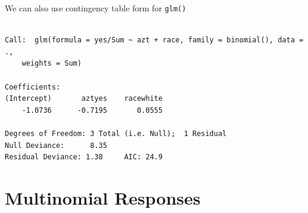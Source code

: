 \documentclass[]{book}
\newenvironment{Shaded}{\begin{snugshade}}{\end{snugshade}}
\newcommand{\DataTypeTok}[1]{\textcolor[rgb]{0.13,0.29,0.53}{#1}}
\newcommand{\KeywordTok}[1]{\textcolor[rgb]{0.13,0.29,0.53}{\textbf{#1}}}
\newcommand{\NormalTok}[1]{#1}
\newcommand{\OperatorTok}[1]{\textcolor[rgb]{0.81,0.36,0.00}{\textbf{#1}}}
\newcommand{\StringTok}[1]{\textcolor[rgb]{0.31,0.60,0.02}{#1}}
\begin{document}
We can also use contingency table form for \texttt{glm()}

\begin{Shaded}
\end{Shaded}

\begin{verbatim}

Call:  glm(formula = yes/Sum ~ azt + race, family = binomial(), data = ., 
    weights = Sum)

Coefficients:
(Intercept)       aztyes    racewhite  
    -1.0736      -0.7195       0.0555  

Degrees of Freedom: 3 Total (i.e. Null);  1 Residual
Null Deviance:      8.35 
Residual Deviance: 1.38     AIC: 24.9
\end{verbatim}

\hypertarget{multinomial-responses}{%
\chapter{Multinomial Responses}\label{multinomial-responses}}
\end{document}
